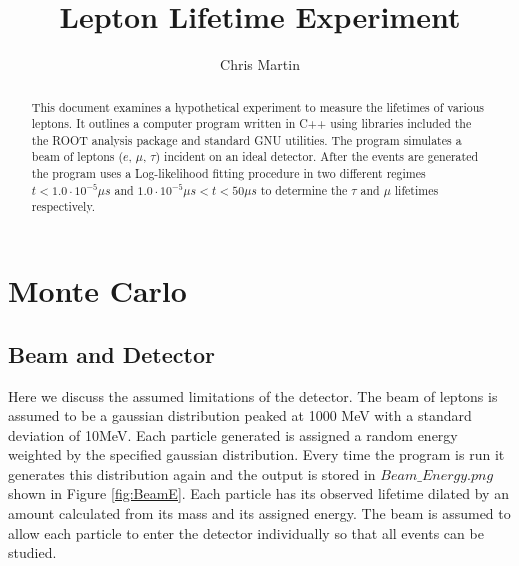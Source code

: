 \documentclass[aps,prl,groupedaddress]{revtex4}
\begin{document}
\title{Lepton Lifetime Experiment}
\author{Chris Martin}

\begin{abstract}
This document examines a hypothetical experiment to measure the lifetimes of various leptons. It outlines a computer program written in C++ using libraries included the the ROOT analysis package \cite{ROOT} and standard GNU utilities. The program simulates a beam of leptons ($e$, $\mu$, $\tau$)  incident on an ideal detector. After the events are generated the program uses a Log-likelihood fitting procedure in two different regimes $t < 1.0\cdot10^{-5} \mu s$ and $1.0\cdot10^{-5} \mu s < t < 50 \mu s$ to determine the $\tau$ and $\mu$ lifetimes respectively. 

\end{abstract}

\maketitle

\section{Monte Carlo}
\subsection{Beam and Detector}
Here we discuss the assumed limitations of the detector. The beam of leptons is assumed to be a gaussian distribution peaked at 1000 MeV with a standard deviation of 10MeV. Each particle generated is assigned a random energy weighted by the specified gaussian distribution. Every time the program is run it generates this distribution again and the output is stored in $Beam\_Energy.png$ shown in Figure \ref{fig:BeamE}. Each particle has its observed lifetime dilated by an amount calculated from its mass and its assigned energy. The beam is assumed to allow each particle to enter the detector individually so that all events can be studied. 
\end{document}

